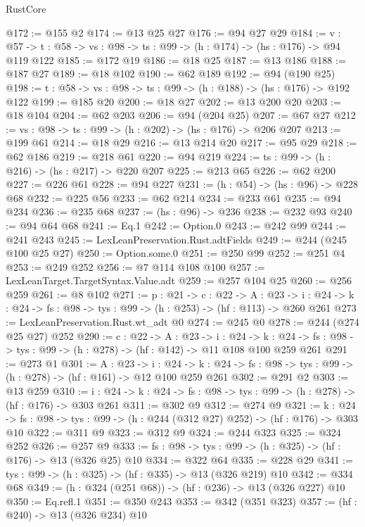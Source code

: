 \begin{lexlean}{RustCore}
\begin{coremodule}
@172 := @155 @2
@174 := @13 @25 @27
@176 := @94 @27 @29
@184 := {v : @57} ->
  {t : @58} -> {vs : @98} -> {ts : @99} -> (h : @174) -> (hs : @176) -> @94 @119 @122
@185 := @172 @19
@186 := @18 @25
@187 := @13 @186
@188 := @187 @27
@189 := @18 @102
@190 := @62 @189
@192 := @94 (@190 @25)
@198 := {t : @58} -> {vs : @98} -> {ts : @99} -> (h : @188) -> (hs : @176) -> @192 @122
@199 := @185 @20
@200 := @18 @27
@202 := @13 @200 @20
@203 := @18 @104
@204 := @62 @203
@206 := @94 (@204 @25)
@207 := @67 @27
@212 := {vs : @98} -> {ts : @99} -> (h : @202) -> (hs : @176) -> @206 @207
@213 := @199 @61
@214 := @18 @29
@216 := @13 @214 @20
@217 := @95 @29
@218 := @62 @186
@219 := @218 @61
@220 := @94 @219
@224 := {ts : @99} -> (h : @216) -> (hs : @217) -> @220 @207
@225 := @213 @65
@226 := @62 @200
@227 := @226 @61
@228 := @94 @227
@231 := (h : @54) -> (hs : @96) -> @228 @68
@232 := @225 @56
@233 := @62 @214
@234 := @233 @61
@235 := @94 @234
@236 := @235 @68
@237 := (hs : @96) -> @236
@238 := @232 @93
@240 := @94 @64 @68
@241 := Eq.{1}
@242 := Option.{0}
@243 := @242 @99
@244 := @241 @243
@245 := LexLeanPreservation.Rust.adtFields
@249 := @244 (@245 @100 @25 @27)
@250 := Option.some.{0}
@251 := @250 @99
@252 := @251 @4
@253 := @249 @252
@256 := @7 @114 @108 @100
@257 := LexLeanTarget.TargetSyntax.Value.adt
@259 := @257 @104 @25
@260 := @256 @259
@261 := @8 @102
@271 := {p : @21} ->
  {c : @22} ->
  {A : @23} ->
  {i : @24} -> {k : @24} -> {fs : @98} -> {tys : @99} -> (h : @253) -> (hf : @113) -> @260 @261
@273 := LexLeanPreservation.Rust.wt_adt @0
@274 := @245 @0
@278 := @244 (@274 @25 @27) @252
@290 := {c : @22} ->
  {A : @23} ->
  {i : @24} ->
  {k : @24} -> {fs : @98} -> {tys : @99} -> (h : @278) -> (hf : @142) -> @11 @108 @100 @259 @261
@291 := @273 @1
@301 := {A : @23} ->
  {i : @24} ->
  {k : @24} -> {fs : @98} -> {tys : @99} -> (h : @278) -> (hf : @161) -> @12 @100 @259 @261
@302 := @291 @2
@303 := @13 @259
@310 := {i : @24} ->
  {k : @24} -> {fs : @98} -> {tys : @99} -> (h : @278) -> (hf : @176) -> @303 @261
@311 := @302 @9
@312 := @274 @9
@321 := {k : @24} ->
  {fs : @98} -> {tys : @99} -> (h : @244 (@312 @27) @252) -> (hf : @176) -> @303 @10
@322 := @311 @9
@323 := @312 @9
@324 := @244 @323
@325 := @324 @252
@326 := @257 @9
@333 := {fs : @98} -> {tys : @99} -> (h : @325) -> (hf : @176) -> @13 (@326 @25) @10
@334 := @322 @64
@335 := @228 @29
@341 := {tys : @99} -> (h : @325) -> (hf : @335) -> @13 (@326 @219) @10
@342 := @334 @68
@349 := (h : @324 (@251 @68)) -> (hf : @236) -> @13 (@326 @227) @10
@350 := Eq.refl.{1}
@351 := @350 @243
@353 := @342 (@351 @323)
@357 := (hf : @240) -> @13 (@326 @234) @10

\end{coremodule}
\end{lexlean}
